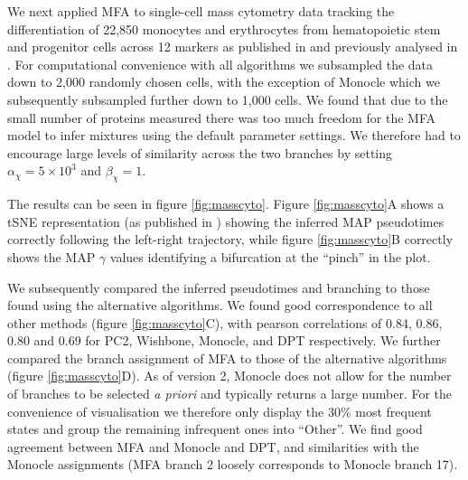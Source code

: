 We next applied MFA to single-cell mass cytometry data tracking the differentiation of 22,850 monocytes and erythrocytes from hematopoietic stem and progenitor cells across 12 markers as published in \cite{bendall2011single} and previously analysed in \cite{setty2016wishbone}. For computational convenience with all algorithms we subsampled the data down to 2,000 randomly chosen cells, with the exception of Monocle which we subsequently subsampled further down to 1,000 cells. We found that due to the small number of proteins measured there was too much freedom for the MFA model to infer mixtures using the default parameter settings. We therefore had to encourage large levels of similarity across the two branches by setting $\alpha_\chi = 5 \times 10^3$ and $\beta_\chi = 1$.

The results can be seen in figure \ref{fig:masscyto}. Figure \ref{fig:masscyto}A shows a tSNE representation (as published in \cite{setty2016wishbone}) showing the inferred MAP pseudotimes correctly following the left-right trajectory, while figure \ref{fig:masscyto}B correctly shows the MAP $\gamma$ values identifying a bifurcation at the ``pinch'' in the plot.

We subsequently compared the inferred pseudotimes and branching to those found using the alternative algorithms. We found good correspondence to all other methods (figure \ref{fig:masscyto}C), with pearson correlations of 0.84, 0.86, 0.80 and 0.69 for PC2, Wishbone, Monocle, and DPT respectively. We further compared the branch assignment of MFA to those of the alternative algorithms (figure \ref{fig:masscyto}D). As of version 2, Monocle does not allow for the number of branches to be selected \emph{a priori} and typically returns a large number. For the convenience of visualisation we therefore only display the 30\% most frequent states and group the remaining infrequent ones into ``Other''. We find good agreement between MFA and Monocle and DPT, and similarities with the Monocle assignments (MFA branch 2 loosely corresponds to Monocle branch 17).

